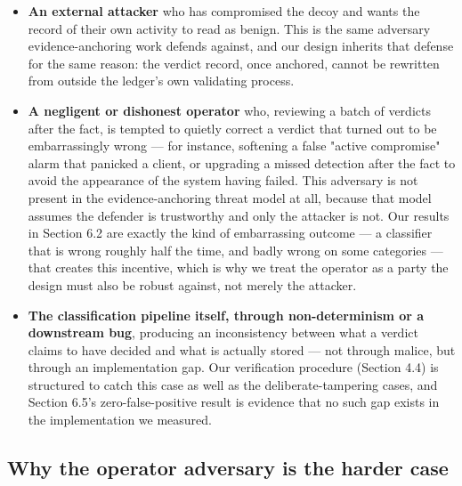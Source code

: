 \documentclass[journal,10pt,twocolumn]{IEEEtran}
\begin{document}
\begin{itemize}
\item \textbf{An external attacker} who has compromised the decoy and wants the record of their own activity to read as benign. This is the same adversary evidence-anchoring work defends against, and our design inherits that defense for the same reason: the verdict record, once anchored, cannot be rewritten from outside the ledger's own validating process.
\item \textbf{A negligent or dishonest operator} who, reviewing a batch of verdicts after the fact, is tempted to quietly correct a verdict that turned out to be embarrassingly wrong --- for instance, softening a false "active compromise" alarm that panicked a client, or upgrading a missed detection after the fact to avoid the appearance of the system having failed. This adversary is not present in the evidence-anchoring threat model at all, because that model assumes the defender is trustworthy and only the attacker is not. Our results in Section 6.2 are exactly the kind of embarrassing outcome --- a classifier that is wrong roughly half the time, and badly wrong on some categories --- that creates this incentive, which is why we treat the operator as a party the design must also be robust against, not merely the attacker.
\item \textbf{The classification pipeline itself, through non-determinism or a downstream bug}, producing an inconsistency between what a verdict claims to have decided and what is actually stored --- not through malice, but through an implementation gap. Our verification procedure (Section 4.4) is structured to catch this case as well as the deliberate-tampering cases, and Section 6.5's zero-false-positive result is evidence that no such gap exists in the implementation we measured.
\end{itemize}

\subsection{Why the operator adversary is the harder case}
\end{document}
